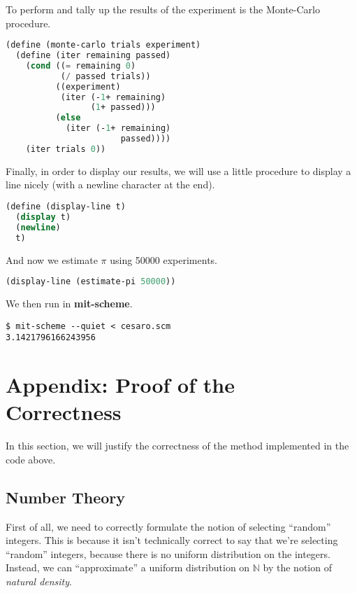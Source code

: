 \documentclass[11pt]{article}
\newcommand{\upright}[1]{{\bf \ttfamily #1}}
\begin{document}
To perform and tally up the results of the experiment is the Monte-Carlo procedure.

\begin{lstlisting}[language=Scheme]
(define (monte-carlo trials experiment)
  (define (iter remaining passed)
    (cond ((= remaining 0)
           (/ passed trials))
          ((experiment)
           (iter (-1+ remaining)
                 (1+ passed)))
          (else
            (iter (-1+ remaining)
                       passed))))
    (iter trials 0))
\end{lstlisting}

Finally, in order to display our results, we will use a little procedure to display a line nicely (with a newline character at the end).

\begin{lstlisting}[language=Scheme]
(define (display-line t)
  (display t)
  (newline)
  t)
\end{lstlisting}

And now we estimate $\pi$ using 50000 experiments.

\begin{lstlisting}[language=Scheme]
(display-line (estimate-pi 50000))
\end{lstlisting}

We then run in \upright{mit-scheme}.

\begin{verbatim}
$ mit-scheme --quiet < cesaro.scm
3.1421796166243956
\end{verbatim}

\newpage

\section*{Appendix: Proof of the Correctness}

In this section, we will justify the correctness of the method implemented in the code above.

\subsection*{Number Theory}
First of all, we need to correctly formulate the notion of selecting ``random'' integers. This is because it isn't technically correct to say that we're selecting ``random'' integers, because there is no uniform distribution on the integers. Instead, we can ``approximate'' a uniform distribution on $\mathbb{N}$ by the notion of {\it natural density}.
\end{document}
